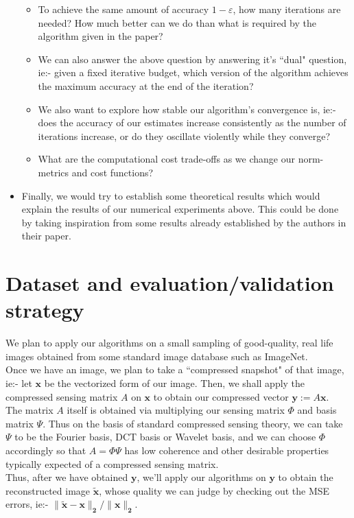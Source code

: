 \documentclass[a4paper,11pt]{article}
\numberwithin{definition}{section}
\numberwithin{mytheorem}{subsection}
\begin{document}
\begin{itemize}
\begin{itemize}
    \item To achieve the same amount of accuracy $1-\varepsilon$, how many iterations are needed? How much better can we do than what is required by the algorithm given in the paper?
    \item We can also answer the above question by answering it's ``dual" question, ie:- given a fixed iterative budget, which version of the algorithm achieves the maximum accuracy at the end of the iteration?
    \item We also want to explore how stable our algorithm's convergence is, ie:- does the accuracy of our estimates increase consistently as the number of iterations increase, or do they oscillate violently while they converge?
    \item What are the computational cost trade-offs as we change our norm-metrics and cost functions?
\end{itemize}
\item Finally, we would try to establish some theoretical results which would explain the results of our numerical experiments above. This could be done by taking inspiration from some results already established by the authors in their paper.
\end{itemize}

\section{Dataset and evaluation/validation strategy}
We plan to apply our algorithms on a small sampling of good-quality, real life images obtained from some standard image database such as ImageNet.\\
Once we have an image, we plan to take a ``compressed snapshot" of that image, ie:- let $\mathbf{x}$ be the vectorized form of our image. Then, we shall apply the compressed sensing matrix $A$ on $\mathbf{x}$ to obtain our compressed vector $\mathbf{y} := A\mathbf{x}$.\\
The matrix $A$ itself is obtained via multiplying our sensing matrix $\Phi$ and basis matrix $\Psi$. Thus on the basis of standard compressed sensing theory, we can take $\Psi$ to be the Fourier basis, DCT basis or Wavelet basis, and we can choose $\Phi$ accordingly so that $A = \Phi\Psi$ has low coherence and other desirable properties typically expected of a compressed sensing matrix.\\
Thus, after we have obtained $\mathbf{y}$, we'll apply our algorithms on $\mathbf{y}$ to obtain the reconstructed image $\mathbf{\tilde{x}}$, whose quality we can judge by checking out the MSE errors, ie:- $\mathbf{\lVert\tilde{x}-x\rVert_2/\lVert x\rVert_2}$.
\end{document}
